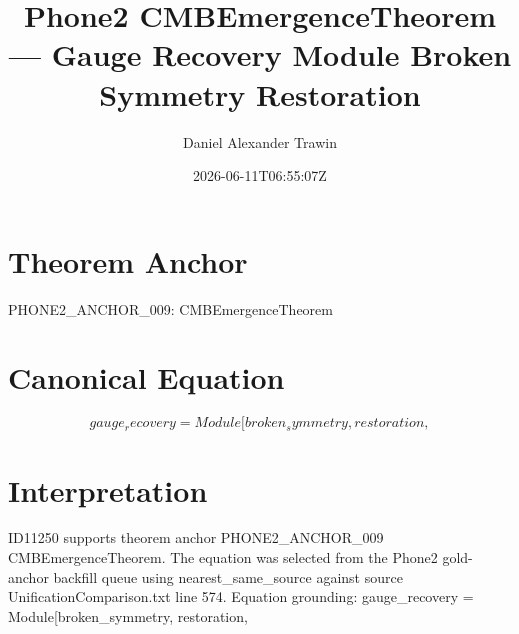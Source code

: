 \documentclass[11pt]{article}
\title{Phone2 CMBEmergenceTheorem — Gauge Recovery Module Broken Symmetry Restoration}
\author{Daniel Alexander Trawin}
\date{2026-06-11T06:55:07Z}
\begin{document}
\maketitle
\section*{Theorem Anchor}
PHONE2_ANCHOR_009: CMBEmergenceTheorem
\section*{Canonical Equation}
\[
gauge_recovery = Module[{broken_symmetry, restoration},
\]
\section*{Interpretation}
ID11250 supports theorem anchor PHONE2_ANCHOR_009 CMBEmergenceTheorem. The equation was selected from the Phone2 gold-anchor backfill queue using nearest_same_source against source UnificationComparison.txt line 574. Equation grounding: gauge_recovery = Module[{broken_symmetry, restoration},
\end{document}
